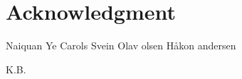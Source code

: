 \chapter*{Acknowledgment}
Naiquan Ye
Carols
Svein
Olav olsen
Håkon andersen

\newline
\newline
\newline

\begin{flushright}
K.B.
\end{flushright}
